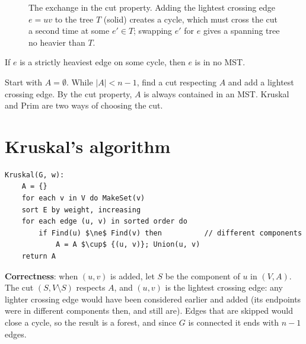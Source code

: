 \begin{figure}[H]
\centering
{}
\caption{The exchange in the cut property. Adding the lightest crossing
edge $e=uv$ to the tree $T$ (solid) creates a cycle, which must cross the
cut a second time at some $e'\in T$; swapping $e'$ for $e$ gives a spanning
tree no heavier than $T$.}
\end{figure}

\begin{theorem}
If $e$ is a strictly heaviest edge on some cycle, then $e$ is in no MST.
\end{theorem}

\begin{important}
Start with $A=\emptyset$. While $|A|<n-1$, find a cut respecting $A$ and add a lightest crossing edge. By the cut property, $A$ is always contained in an MST.
Kruskal and Prim are two ways of choosing the cut.
\end{important}

\section{Kruskal's algorithm}
\begin{lstlisting}[style=pseudo]
Kruskal(G, w):
    A = {}
    for each v in V do MakeSet(v)
    sort E by weight, increasing
    for each edge (u, v) in sorted order do
        if Find(u) $\ne$ Find(v) then          // different components
            A = A $\cup$ {(u, v)}; Union(u, v)
    return A
\end{lstlisting}
\textbf{Correctness}: when $(u,v)$ is added, let $S$ be the component of $u$ in $(V,A)$. The cut $(S,V\setminus S)$ respects $A$, and $(u,v)$ is the lightest
crossing edge: any lighter crossing edge would have been considered earlier and added (its endpoints were in different components then, and still are).
Edges that are skipped would close a cycle, so the result is a forest, and since $G$ is connected it ends with $n-1$ edges.

